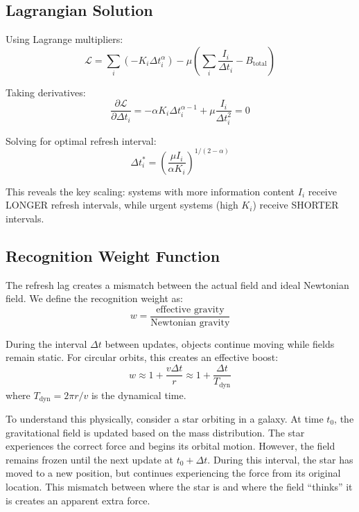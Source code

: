 \documentclass[twocolumn,prd,amsmath,amssymb,aps,superscriptaddress,nofootinbib]{revtex4-2}
\begin{document}
\subsection{Lagrangian Solution}

Using Lagrange multipliers:
\begin{equation}
\mathcal{L} = \sum_i (-K_i \Delta t_i^\alpha) - \mu\left(\sum_i \frac{I_i}{\Delta t_i} - B_{\text{total}}\right)
\end{equation}

Taking derivatives:
\begin{equation}
\frac{\partial \mathcal{L}}{\partial \Delta t_i} = -\alpha K_i \Delta t_i^{\alpha-1} + \mu \frac{I_i}{\Delta t_i^2} = 0
\end{equation}

Solving for optimal refresh interval:
\begin{equation}
\Delta t_i^* = \left(\frac{\mu I_i}{\alpha K_i}\right)^{1/(2-\alpha)}
\end{equation}

This reveals the key scaling: systems with more information content $I_i$ receive LONGER refresh intervals, while urgent systems (high $K_i$) receive SHORTER intervals.

\subsection{Recognition Weight Function}

The refresh lag creates a mismatch between the actual field and ideal Newtonian field. We define the recognition weight as:
\begin{equation}
w = \frac{\text{effective gravity}}{\text{Newtonian gravity}}
\end{equation}

During the interval $\Delta t$ between updates, objects continue moving while fields remain static. For circular orbits, this creates an effective boost:
\begin{equation}
w \approx 1 + \frac{v \Delta t}{r} \approx 1 + \frac{\Delta t}{T_{\text{dyn}}}
\end{equation}
where $T_{\text{dyn}} = 2\pi r/v$ is the dynamical time.

To understand this physically, consider a star orbiting in a galaxy. At time $t_0$, the gravitational field is updated based on the mass distribution. The star experiences the correct force and begins its orbital motion. However, the field remains frozen until the next update at $t_0 + \Delta t$. During this interval, the star has moved to a new position, but continues experiencing the force from its original location. This mismatch between where the star is and where the field ``thinks'' it is creates an apparent extra force.
\end{document}
